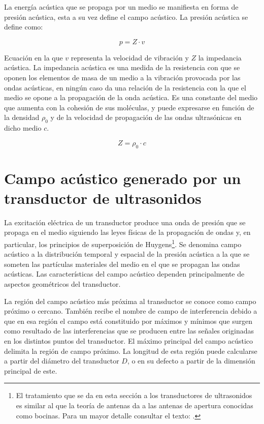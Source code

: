 La energía acústica que se propaga por un medio se manifiesta en forma de
presión acústica, esta a su vez define el campo acústico. La presión
acústica se define como:

\begin{equation}
	p = Z\cdot v
	\label{eq:acuospressure}
\end{equation}

Ecuación en la que $v$ representa la velocidad de vibración y $Z$ la
impedancia acústica. La impedancia acústica es una medida de la resistencia
con que se oponen los elementos de masa de un medio a la vibración
provocada por las ondas acústicas, en ningún caso da una relación de la
resistencia con la que el medio se opone a la propagación de la onda
acústica. Es una constante del medio que aumenta con la cohesión de sus
moléculas, y puede expresarse en función de la densidad $\rho_0$ y de la
velocidad de propagación de las ondas ultrasónicas en dicho medio $c$.

\begin{equation}
	Z = \rho_0\cdot c
	\label{eq:Zacoustic}
\end{equation}


\section[Campo acústico generado por un transductor]{Campo acústico
generado por un transductor de ultrasonidos}\label{sec:field}

La excitación eléctrica de un transductor produce una onda de presión que
se propaga en el medio siguiendo las leyes físicas de la propagación de
ondas y, en particular, los principios de superposición de
Huygens\footnote{El tratamiento que se da en esta sección a los
transductores de ultrasonidos es similar al que la teoría de antenas da a
las antenas de apertura conocidas como bocinas. Para un mayor detalle
consultar el texto: \citet{stutzman1997atd}.}. Se denomina campo acústico a
la distribución temporal y espacial de la presión acústica a la que se
someten las partículas materiales del medio en el que se propagan las ondas
acústicas. Las características del campo acústico dependen principalmente
de aspectos geométricos del transductor.

La región del campo acústico más próxima al transductor se conoce como
campo próximo o cercano. También recibe el nombre de campo de interferencia
debido a que en esa región el campo está constituido por máximos y mínimos
que surgen como resultado de las interferencias que se producen entre las
señales originadas en los distintos puntos del transductor. El máximo
principal del campo acústico delimita la región de campo próximo. La
longitud de esta región puede calcularse a partir del diámetro del
transductor $D$, o en su defecto a partir de la dimensión principal de
este.

